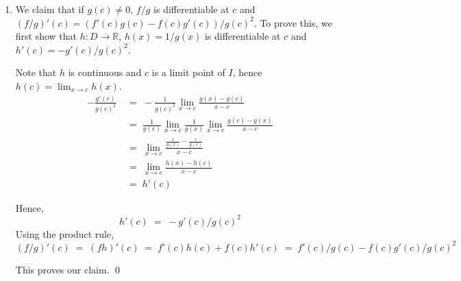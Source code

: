 \documentclass[10pt]{article}
\begin{document}
\begin{enumerate}
		Note that since $c$ is a limit point of $I$, $f(c) = \lim_{x \to c} f(x)$ and $g(c) = \lim_{x \to c} g(x)$.
		\begin{align*}
			f'(c)g(c) + f(c)g'(c)
			\;&=\; g(c) \lim_{x \to c} \frac{f(x) - f(c)}{x - c} + \lim_{x \to c} f(x) \lim_{x \to c} \frac{g(x) - g(c)}{x - c} \\
			\;&=\; \lim_{x \to c} \frac{(f(x) - f(c))g(c) + f(x)(g(x) - g(c))}{x - c} \\
			\;&=\; \lim_{x \to c} \frac{f(x)g(c) - f(c)g(c) + f(x)g(x) - f(x)g(c)}{x - c} \\
			\;&=\; \lim_{x \to c} \frac{f(x)g(x) - f(c)g(c)}{x - c} \\
			\;&=\; \lim_{x \to c} \frac{(fg)(x) - (fg)(c)}{x - c} \\
			\;&=\; (fg)'(c)
		\end{align*}
		
		Hence,
		\[
		(fg)'(c) \;=\; \lim_{x \to c} \frac{(fg)(x) - (fg)(c)}{x - c} \;=\; f'(c)g(c) + f(c)g'(c)
		\]
		
		This proves our claim. \qed
		
		
		\item We claim that if $g(c) \neq 0$, $f /g$ is differentiable at $c$ and $(f /g)'(c) = (f'(c)g(c) - f(c)g'(c))/g(c)^2$.
		To prove this, we first show that $h\colon D \to \mathbb{R}$, $h(x) = 1/g(x)$ is
		differentiable at $c$ and $h'(c) = -g'(c) /g(c)^2$.
		
		Note that $h$ is continuous and $c$ is a limit point of $I$, hence $h(c) = \lim_{x \to c} h(x)$.
		\begin{align*}
			-\frac{g'(c)}{g(c)^2} \;&=\; -\frac{1}{g(c)^2} \lim_{x \to c} \frac{g(x) - g(c)}{x - c} \\
			\;&=\; \frac{1}{g(c)} \lim_{x \to c}\frac{1}{g(x)} \lim_{x \to c} \frac{g(c) - g(x)}{x - c} \\
			\;&=\; \lim_{x \to c} \frac{\frac{1}{g(x)} - \frac{1}{g(c)}}{x - c} \\
			\;&=\; \lim_{x \to c} \frac{h(x) - h(c)}{x - c} \\
			\;&=\; h'(c)
		\end{align*}
		
		Hence,
		\[
		h'(c) \;=\; -g'(c)/g(c)^2
		\]
		Using the product rule,
		\[
		(f /g)'(c) \;=\; (fh)'(c) \;=\; f'(c)h(c) + f(c)h'(c) \;=\; f'(c)/g(c) - f(c)g'(c)/g(c)^2
		\]
		
		This proves our claim. \qed
	\end{enumerate}
	
\end{document}
